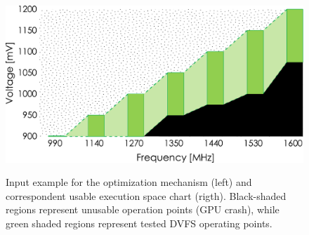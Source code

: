 \begin{figure}[!htb]
    \begin{center}
        \begin{minipage}[t]{.5\textwidth}
            \vspace{0pt}
            \centering
        \end{minipage}%
        \begin{minipage}[t]{.45\textwidth}
            \vspace{0pt}
            \centering
            \includegraphics[width=\textwidth]{Figures/Optimization/UESex.pdf}
            \label{fig:uesex}
        \end{minipage}
    \end{center}
    \label{fig:input}
    \caption{Input example for the optimization mechanism (left) and correspondent usable execution space chart (rigth). Black-shaded regions represent unusable operation points (GPU crash), while green shaded regions represent tested DVFS operating points.}
\end{figure}





